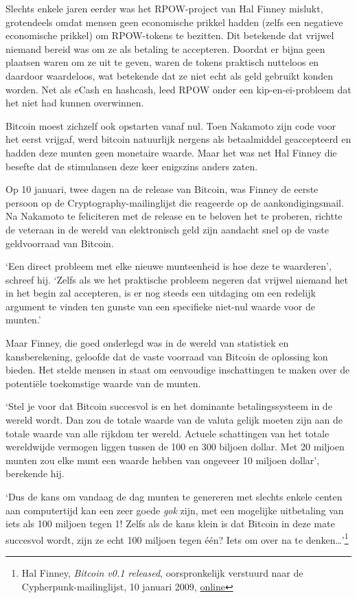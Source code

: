\documentclass[
  a5paper,
  smalldemyvopaper,11pt,twoside,onecolumn,openright,extrafontsizes,
hidelinks]{memoir}
\begin{document}
Slechts enkele jaren eerder was het RPOW-project van Hal Finney mislukt,
grotendeels omdat mensen geen economische prikkel hadden (zelfs een
negatieve economische prikkel) om RPOW-tokens te bezitten. Dit betekende
dat vrijwel niemand bereid was om ze als betaling te accepteren. Doordat
er bijna geen plaatsen waren om ze uit te geven, waren de tokens
praktisch nutteloos en daardoor waardeloos, wat betekende dat ze niet
echt als geld gebruikt konden worden. Net als eCash en hashcash, leed
RPOW onder een kip-en-ei-probleem dat het niet had kunnen overwinnen.

Bitcoin moest zichzelf ook opstarten vanaf nul. Toen Nakamoto zijn code
voor het eerst vrijgaf, werd bitcoin natuurlijk nergens als betaalmiddel
geaccepteerd en hadden deze munten geen monetaire waarde. Maar het was
net Hal Finney die besefte dat de stimulansen deze keer enigszins anders
zaten.

Op 10 januari, twee dagen na de release van Bitcoin, was Finney de
eerste persoon op de Cryptography-mailinglijst die reageerde op de
aankondigingsmail. Na Nakamoto te feliciteren met de release en te
beloven het te proberen, richtte de veteraan in de wereld van
elektronisch geld zijn aandacht snel op de vaste geldvoorraad van
Bitcoin.

`Een direct probleem met elke nieuwe munteenheid is hoe deze te
waarderen', schreef hij. `Zelfs als we het praktische probleem negeren
dat vrijwel niemand het in het begin zal accepteren, is er nog steeds
een uitdaging om een redelijk argument te vinden ten gunste van een
specifieke niet-nul waarde voor de munten.'

Maar Finney, die goed onderlegd was in de wereld van statistiek en
kansberekening, geloofde dat de vaste voorraad van Bitcoin de oplossing
kon bieden. Het stelde mensen in staat om eenvoudige inschattingen te
maken over de potentiële toekomstige waarde van de munten.

`Stel je voor dat Bitcoin succesvol is en het dominante betalingssysteem
in de wereld wordt. Dan zou de totale waarde van de valuta gelijk moeten
zijn aan de totale waarde van alle rijkdom ter wereld. Actuele
schattingen van het totale wereldwijde vermogen liggen tussen de 100 en
300 biljoen dollar. Met 20 miljoen munten zou elke munt een waarde
hebben van ongeveer 10 miljoen dollar', berekende hij.

`Dus de kans om vandaag de dag munten te genereren met slechts enkele
centen aan computertijd kan een zeer goede \emph{gok} zijn, met een
mogelijke uitbetaling van iets als 100 miljoen tegen 1! Zelfs als de
kans klein is dat Bitcoin in deze mate succesvol wordt, zijn ze echt 100
miljoen tegen één? Iets om over na te denken\ldots{}'\footnote{Hal
  Finney, \emph{Bitcoin v0.1 released}, oorspronkelijk verstuurd naar de
  Cypherpunk-mailinglijst, 10 januari 2009,
  \href{https://www.metzdowd.com/pipermail/cryptography/2009-January/015004.html}{online}}
\end{document}
